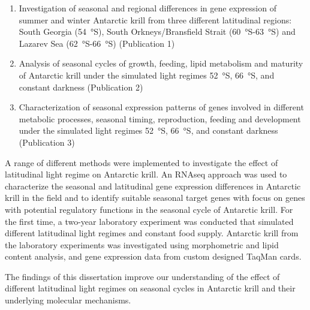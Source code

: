 \begin{enumerate}
\item Investigation of seasonal and regional differences in gene expression of
        summer and winter Antarctic krill from three different latitudinal
                regions: South Georgia (\SI{54}{\degree}S), South
                Orkneys/Bransfield Strait (\SI{60}{\degree}S-\SI{63}{\degree}S)
                and Lazarev Sea (\SI{62}{\degree}S-\SI{66}{\degree}S)
                (Publication 1)
\item Analysis of seasonal cycles of growth, feeding, lipid metabolism and
        maturity of Antarctic krill under the simulated light regimes
                \SI{52}{\degree}S, \SI{66}{\degree}S, and constant darkness
                (Publication 2)
\item Characterization of seasonal expression patterns of genes involved in
        different metabolic processes, seasonal timing, reproduction, feeding
                and development under the simulated light regimes
                \SI{52}{\degree}S, \SI{66}{\degree}S, and constant darkness
                (Publication 3)
\end{enumerate}

A range of different methods were implemented to investigate the effect of
latitudinal light regime on Antarctic krill. An RNAseq approach was used to
characterize the seasonal and latitudinal gene expression differences in
Antarctic krill in the field and to identify suitable seasonal target genes
with focus on genes with potential regulatory functions in the seasonal cycle
of Antarctic krill. For the first time, a two-year laboratory experiment was
conducted that simulated different latitudinal light regimes and constant food
supply. Antarctic krill from the laboratory experiments was investigated using
morphometric and lipid content analysis, and gene expression data from custom
designed TaqMan cards.

The findings of this dissertation improve our understanding of the effect of
different latitudinal light regimes on seasonal cycles in Antarctic krill and
their underlying molecular mechanisms.
